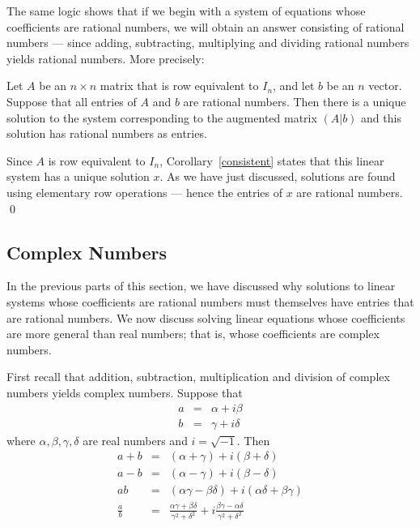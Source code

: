 The same logic shows that if we begin with a system of equations
whose coefficients are rational numbers, we will obtain an
answer consisting of rational numbers --- since adding,
subtracting, multiplying and dividing rational numbers yields
rational numbers. More precisely:
\begin{thm}
Let $A$ be an $n\times n$ matrix that is row equivalent to
$I_n$, and let $b$ be an $n$ vector.  Suppose that all entries of
$A$ and $b$ are rational numbers.  Then there is a unique
solution to the system corresponding to the augmented matrix
$(A|b)$ and this solution has rational numbers as entries.
\end{thm}

\proof Since $A$ is row equivalent to $I_n$,
Corollary~\ref{consistent} states that this linear system
has a unique solution $x$.  As we have just discussed, solutions
are found using elementary row operations --- hence the entries
of $x$ are rational numbers.  \qed


\subsection*{Complex Numbers} 

In the previous parts of this section, we have discussed why
solutions to linear systems whose coefficients are rational
numbers must themselves have entries that are rational numbers.
We now discuss solving linear equations whose coefficients are
more general than real numbers; that is, whose coefficients are
complex numbers.

First recall that addition, subtraction, multiplication and
division of complex numbers yields complex numbers.  Suppose
that
\begin{eqnarray*}
a & = & \alpha + i\beta \\
b & = & \gamma + i\delta
\end{eqnarray*}
where $\alpha,\beta,\gamma,\delta$ are real numbers and
$i=\sqrt{-1}$. Then
\begin{eqnarray*}
a+b & = & (\alpha+\gamma) + i(\beta+\delta) \\
a-b & = & (\alpha-\gamma) + i(\beta-\delta) \\
ab & = &
(\alpha\gamma-\beta\delta)+i(\alpha\delta+\beta\gamma)\\
\frac{a}{b} & = & \frac{\alpha\gamma+\beta\delta}{\gamma^2+\delta^2}+
i\frac{\beta\gamma-\alpha\delta}{\gamma^2+\delta^2}
\end{eqnarray*}

